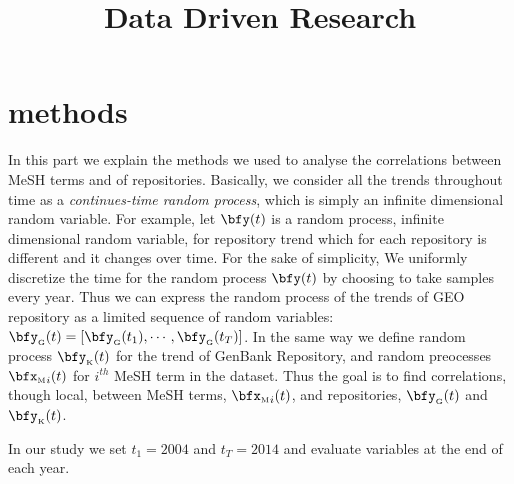 \documentclass[twoside,11pt]{article}
\def\bfyg{\bfy_{\text{\tiny G}}}
\def\bfyk{\bfy_{\text{\tiny K}}}
\def\bfxm{{\bfx_{\text{\tiny M}}}}
\begin{document}
\title{Data Driven Research}



\maketitle



\section{methods} 
In this part we explain the methods we used to analyse the correlations between MeSH terms and of repositories.
Basically, we consider all the trends throughout time as a \emph{continues-time random process}, which is simply an infinite dimensional random variable. For example, let $\bfy(t)$ is a random process, infinite dimensional random variable, for repository trend which for each repository is different and it changes over time. For the sake of simplicity, We uniformly discretize the time for the random process $\bfy(t)$ by choosing to take samples every year. Thus we can express the random process of the trends of GEO repository as a limited sequence of random variables: $\bfyg (t) = [\bfyg(t_1), \cdots, \bfyg(t_T) ]$.  In the same way we define random process $\bfyk(t)$ for the trend  of GenBank Repository, and random preocesses $\bfxm_i(t)$ for $i^{th}$ MeSH term in the dataset. Thus the goal is to find correlations, though local, between MeSH terms, $\bfxm_i(t)$, and repositories, $\bfyg(t)$ and $\bfyk(t)$.

In our study we set $t_1=2004$ and $t_T=2014$ and evaluate variables at the end of each year.
\end{document}
